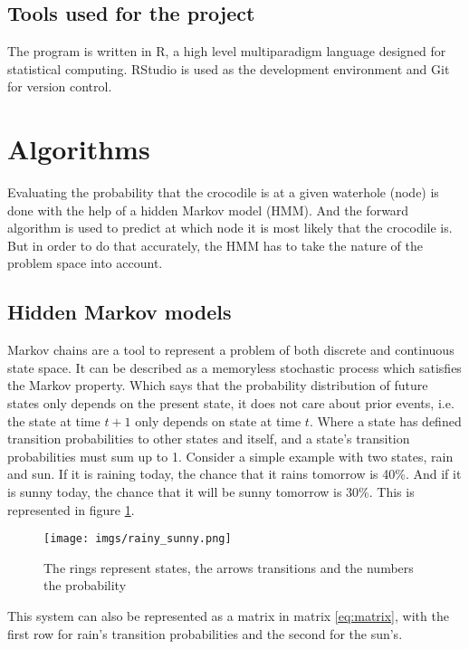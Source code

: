 \documentclass[12pt, a4paper]{article}
\begin{document}
\subsection{Tools used for the project}

The program is written in R, a high level multiparadigm language designed for statistical computing. RStudio is used as the development environment and Git\cite{git} for version control. 

\section{Algorithms}

Evaluating the probability that the crocodile is at a given waterhole (node) is done with the help of a hidden Markov model (HMM)\cite{hmm}. And the forward algorithm\cite{falg} is used to predict at which node it is most likely that the crocodile is. But in order to do that accurately, the HMM has to take the nature of the problem space into account.

\subsection{Hidden Markov models}

Markov chains are a tool to represent a problem of both discrete and continuous state space. It can be described as a memoryless stochastic process which satisfies the Markov property. Which says that the probability distribution of future states only depends on the present state, it does not care about prior events, i.e. the state at time $t+1$ only depends on state at time $t$\cite{hmm}\cite{MA-hmm}. Where a state has defined transition probabilities to other states and itself, and a state's transition probabilities must sum up to 1. Consider a simple example with two states, rain and sun. If it is raining today, the chance that it rains tomorrow is 40\%. And if it is sunny today, the chance that it will be sunny tomorrow is 30\%. This is represented in figure \ref{fig:rain-sun}.

\newpage
\begin{figure}[!ht]
\centering
\texttt{[image: imgs/rainy\_sunny.png]}\\
\caption{The rings represent states, the arrows transitions and the numbers the probability}
\label{fig:rain-sun}
\end{figure}

This system can also be represented as a matrix in matrix \ref{eq:matrix}, with the first row for rain's transition probabilities and the second for the sun's.
\end{document}
